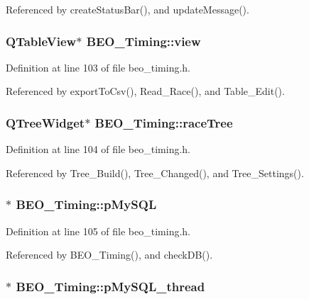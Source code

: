 Referenced by createStatusBar(), and updateMessage().\hypertarget{class_b_e_o___timing_48b9d6ca16febbddf487260d130925b1}{
\subsubsection[view]{\setlength{\rightskip}{0pt plus 5cm}QTableView$\ast$ {\bf BEO\_\-Timing::view}}}
\label{class_b_e_o___timing_48b9d6ca16febbddf487260d130925b1}




Definition at line 103 of file beo\_\-timing.h.

Referenced by exportToCsv(), Read\_\-Race(), and Table\_\-Edit().\hypertarget{class_b_e_o___timing_2ec471682ac3f39eedd965fa2e94f3d7}{
\subsubsection[raceTree]{\setlength{\rightskip}{0pt plus 5cm}QTreeWidget$\ast$ {\bf BEO\_\-Timing::raceTree}}}
\label{class_b_e_o___timing_2ec471682ac3f39eedd965fa2e94f3d7}




Definition at line 104 of file beo\_\-timing.h.

Referenced by Tree\_\-Build(), Tree\_\-Changed(), and Tree\_\-Settings().\hypertarget{class_b_e_o___timing_59ff5cd2ab570b6aaec5e4d6367e107b}{
\subsubsection[pMySQL]{$\ast$ {\bf BEO\_\-Timing::pMySQL}}}
\label{class_b_e_o___timing_59ff5cd2ab570b6aaec5e4d6367e107b}




Definition at line 105 of file beo\_\-timing.h.

Referenced by BEO\_\-Timing(), and checkDB().\hypertarget{class_b_e_o___timing_2690847a55f7a275ba0df12f8a5e5827}{
\subsubsection[pMySQL\_\-thread]{$\ast$ {\bf BEO\_\-Timing::pMySQL\_\-thread}}}
\label{class_b_e_o___timing_2690847a55f7a275ba0df12f8a5e5827}




